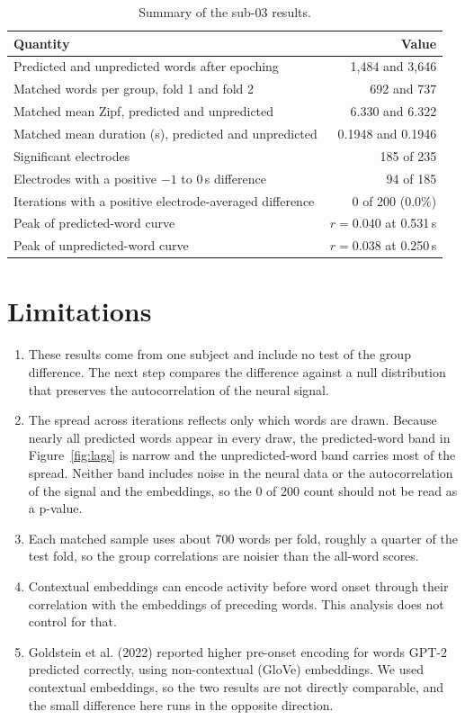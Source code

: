 \documentclass[11pt]{article}
\begin{document}
\begin{table}[htbp]
\centering
\caption{Summary of the sub-03 results.}
\label{tab:summary}
\begin{tabular}{lr}
\toprule
Quantity & Value \\
\midrule
Predicted and unpredicted words after epoching & 1,484 and 3,646 \\
Matched words per group, fold 1 and fold 2 & 692 and 737 \\
Matched mean Zipf, predicted and unpredicted & 6.330 and 6.322 \\
Matched mean duration (s), predicted and unpredicted & 0.1948 and 0.1946 \\
Significant electrodes & 185 of 235 \\
Electrodes with a positive $-1$ to 0\,s difference & 94 of 185 \\
Iterations with a positive electrode-averaged difference & 0 of 200 (0.0\%) \\
Peak of predicted-word curve & $r = 0.040$ at 0.531\,s \\
Peak of unpredicted-word curve & $r = 0.038$ at 0.250\,s \\
\bottomrule
\end{tabular}
\end{table}

\section{Limitations}

\begin{enumerate}
\item These results come from one subject and include no test of the group difference. The next step compares the difference against a null distribution that preserves the autocorrelation of the neural signal.
\item The spread across iterations reflects only which words are drawn. Because nearly all predicted words appear in every draw, the predicted-word band in Figure~\ref{fig:lags} is narrow and the unpredicted-word band carries most of the spread. Neither band includes noise in the neural data or the autocorrelation of the signal and the embeddings, so the 0 of 200 count should not be read as a p-value.
\item Each matched sample uses about 700 words per fold, roughly a quarter of the test fold, so the group correlations are noisier than the all-word scores.
\item Contextual embeddings can encode activity before word onset through their correlation with the embeddings of preceding words. This analysis does not control for that.
\item Goldstein et al. (2022) reported higher pre-onset encoding for words GPT-2 predicted correctly, using non-contextual (GloVe) embeddings. We used contextual embeddings, so the two results are not directly comparable, and the small difference here runs in the opposite direction.
\end{enumerate}
\end{document}

